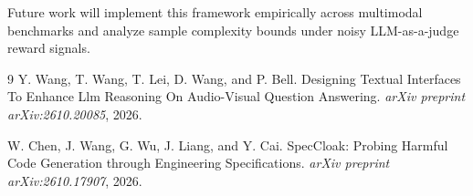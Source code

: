 \documentclass[11pt,a4paper]{article}
\begin{document}
Future work will implement this framework empirically across multimodal benchmarks and analyze sample complexity bounds under noisy LLM-as-a-judge reward signals.

\begin{thebibliography}{9}
Y. Wang, T. Wang, T. Lei, D. Wang, and P. Bell.
\newblock Designing Textual Interfaces To Enhance Llm Reasoning On Audio-Visual Question Answering.
\newblock \emph{arXiv preprint arXiv:2610.20085}, 2026.

W. Chen, J. Wang, G. Wu, J. Liang, and Y. Cai.
\newblock SpecCloak: Probing Harmful Code Generation through Engineering Specifications.
\newblock \emph{arXiv preprint arXiv:2610.17907}, 2026.
\end{thebibliography}
\end{document}
